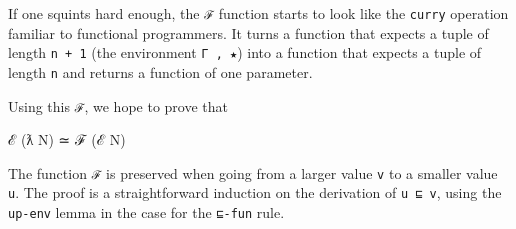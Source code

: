 If one squints hard enough, the \texttt{ℱ} function starts to look like
the \texttt{curry} operation familiar to functional programmers. It
turns a function that expects a tuple of length \texttt{n\ +\ 1} (the
environment \texttt{Γ\ ,\ ★}) into a function that expects a tuple of
length \texttt{n} and returns a function of one parameter.

Using this \texttt{ℱ}, we hope to prove that

\begin{myDisplay}
ℰ (ƛ N) ≃ ℱ (ℰ N)
\end{myDisplay}

The function \texttt{ℱ} is preserved when going from a larger value
\texttt{v} to a smaller value \texttt{u}. The proof is a straightforward
induction on the derivation of \texttt{u\ ⊑\ v}, using the
\texttt{up-env} lemma in the case for the \texttt{⊑-fun} rule.

